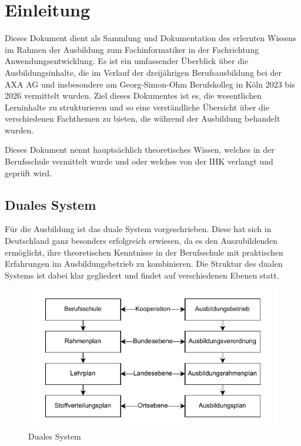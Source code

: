 \chapter{Einleitung}

Dieses Dokument dient als Sammlung und Dokumentation des erlernten Wissens im Rahmen der Ausbildung zum Fachinformatiker in der Fachrichtung Anwendungsentwicklung. Es ist ein umfassender Überblick über die Ausbildungsinhalte, die im Verlauf der dreijährigen Berufsausbildung bei der AXA AG und insbesondere am Georg-Simon-Ohm Berufskolleg in Köln 2023 bis 2026 vermittelt wurden. Ziel dieses Dokumentes ist es, die wesentlichen Lerninhalte zu strukturieren und so eine verständliche Übersicht über die verschiedenen Fachthemen zu bieten, die während der Ausbildung behandelt wurden.

Dieses Dokument nennt hauptsächlich theoretisches Wissen, welches in der Berufsschule vermittelt wurde und oder welches von der IHK verlangt und geprüft wird.

\section{Duales System}

Für die Ausbildung ist das duale System vorgeschrieben. Diese hat sich in Deutschland ganz besonders erfolgreich erwiesen, da es den Auszubildenden ermöglicht, ihre theoretischen Kenntnisse in der Berufsschule mit praktischen Erfahrungen im Ausbildungsbetrieb zu kombinieren. Die Struktur des dualen Systems ist dabei klar gegliedert und findet auf verschiedenen Ebenen statt.

\begin{figure}[H]
    \centering
    \includegraphics{figures/Duales_System.drawio.pdf}
    \caption{Duales System}
    \label{fig:dualesSystem}
\end{figure}


